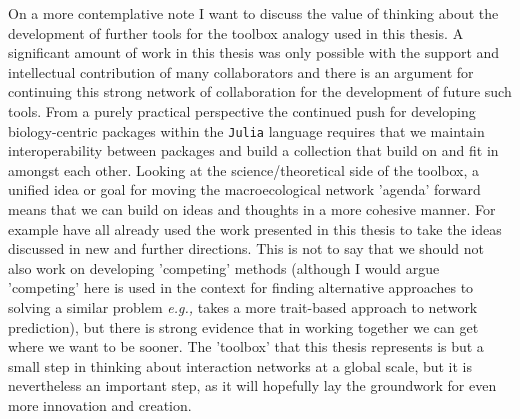 On a more contemplative note I want to discuss the value of thinking about the development of further tools for the toolbox analogy used in this thesis. A significant amount of work in this thesis was only possible with the support and intellectual contribution of many collaborators and there is an argument for continuing this strong network of collaboration for the development of future such tools. From a purely practical perspective the continued push for developing biology-centric packages within the \texttt{Julia} language \cite{Roesch2021Julia} requires that we maintain interoperability between packages and build a collection that build on and fit in amongst each other. Looking at the science/theoretical side of the toolbox, a unified idea or goal for moving the macroecological network 'agenda' forward means that we can build on ideas and thoughts in a more cohesive manner. For example \cite{Dansereau2023Spatially, Catchen2023Improving, Banville2023What} have all already used the work presented in this thesis to take the ideas discussed in new and further directions. This is not to say that we should not also work on developing 'competing' methods (although I would argue 'competing' here is used in the context for finding alternative approaches to solving a similar problem \emph{e.g.,} \cite{Caron2022Addressing} takes a more trait-based approach to network prediction), but there is strong evidence that in working together we can get where we want to be sooner. The 'toolbox' that this thesis represents is but a small step in thinking about interaction networks at a global scale, but it is nevertheless an important step, as it will hopefully lay the groundwork for even more innovation and creation.

\printbibliography

\endinput